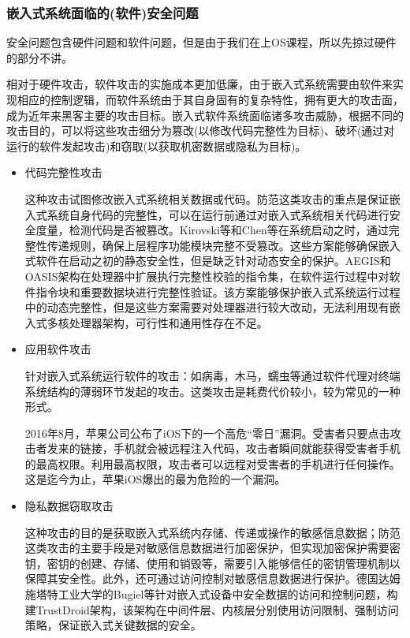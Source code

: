 \documentclass[12pt, a4paper]{article}
\begin{document}
	\subsubsection{嵌入式系统面临的(软件)安全问题}
	安全问题包含硬件问题和软件问题，但是由于我们在上OS课程，所以先掠过硬件的部分不讲。
	
	相对于硬件攻击，软件攻击的实施成本更加低廉，由于嵌入式系统需要由软件来实现相应的控制逻辑，而软件系统由于其自身固有的复杂特性，拥有更大的攻击面，成为近年来黑客主要的攻击目标。嵌入式软件系统面临诸多攻击威胁，根据不同的攻击目的，可以将这些攻击细分为篡改(以修改代码完整性为目标)、破坏(通过对运行的软件发起攻击)和窃取(以获取机密数据或隐私为目标)。
	
	\begin{itemize}
		\item 代码完整性攻击
		
		这种攻击试图修改嵌入式系统相关数据或代码。防范这类攻击的重点是保证嵌入式系统自身代码的完整性，可以在运行前通过对嵌入式系统相关代码进行安全度量，检测代码是否被篡改。Kirovski等和Chen等在系统启动之时，通过完整性传递规则，确保上层程序功能模块完整不受篡改。这些方案能够确保嵌入式软件在启动之初的静态安全性，但是缺乏针对动态安全的保护。AEGIS和OASIS架构在处理器中扩展执行完整性校验的指令集，在软件运行过程中对软件指令块和重要数据块进行完整性验证。该方案能够保护嵌入式系统运行过程中的动态完整性，但是这些方案需要对处理器进行较大改动，无法利用现有嵌入式多核处理器架构，可行性和通用性存在不足。
		
		\item 应用软件攻击
		
		针对嵌入式系统运行软件的攻击：如病毒，木马，蠕虫等通过软件代理对终端系统结构的薄弱环节发起的攻击。这类攻击是耗费代价较小，较为常见的一种形式。
		
		2016年8月，苹果公司公布了iOS下的一个高危“零日”漏洞。受害者只要点击攻击者发来的链接，手机就会被远程注入代码，攻击者瞬间就能获得受害者手机的最高权限。利用最高权限，攻击者可以远程对受害者的手机进行任何操作。这是迄今为止，苹果iOS爆出的最为危险的一个漏洞。
		
		\item 隐私数据窃取攻击
		
		这种攻击的目的是获取嵌入式系统内存储、传递或操作的敏感信息数据；防范这类攻击的主要手段是对敏感信息数据进行加密保护，但实现加密保护需要密钥，密钥的创建、存储、使用和销毁等，需要引入能够信任的密钥管理机制以保障其安全性。此外，还可通过访问控制对敏感信息数据进行保护。德国达姆施塔特工业大学的Bugiel等针对嵌入式设备中安全数据的访问和控制问题，构建TrustDroid架构，该架构在中间件层、内核层分别使用访问限制、强制访问策略，保证嵌入式关键数据的安全。
	\end{itemize}
	
\end{document}
